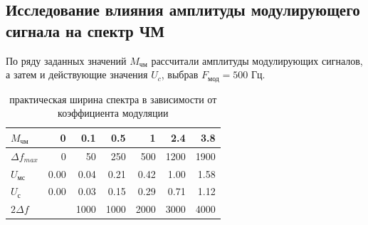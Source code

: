 \subsection{Исследование влияния амплитуды модулирующего сигнала на спектр ЧМ}
По ряду заданных значений $M_\text{чм}$ рассчитали амплитуды модулирующих сигналов, а затем и действующие значения $U_c$, выбрав $F_\text{мод}=500\text{ Гц}$.
\begin{table}[htbp]
  \centering
  \caption{практическая ширина спектра в зависимости от коэффициента модуляции}
    \begin{tabular}{|l|r|r|r|r|r|r|}
    \toprule
    $M_\text{чм}$ & 0     & 0.1   & 0.5   & 1     & 2.4   & 3.8 \\
    \midrule
    $\Delta f_{max}$ & 0     & 50    & 250   & 500   & 1200  & 1900 \\
    \midrule
    $U_\text{мс}$ & 0.00  & 0.04  & 0.21  & 0.42  & 1.00  & 1.58 \\
    \midrule
    $U_\text{с}$  & 0.00  & 0.03  & 0.15  & 0.29  & 0.71  & 1.12 \\
    \midrule
    $2 \Delta f$ &       & 1000  & 1000  & 2000  & 3000  & 4000 \\
    \bottomrule
    \end{tabular}%
  \label{tab:tab2}%
\end{table}%

